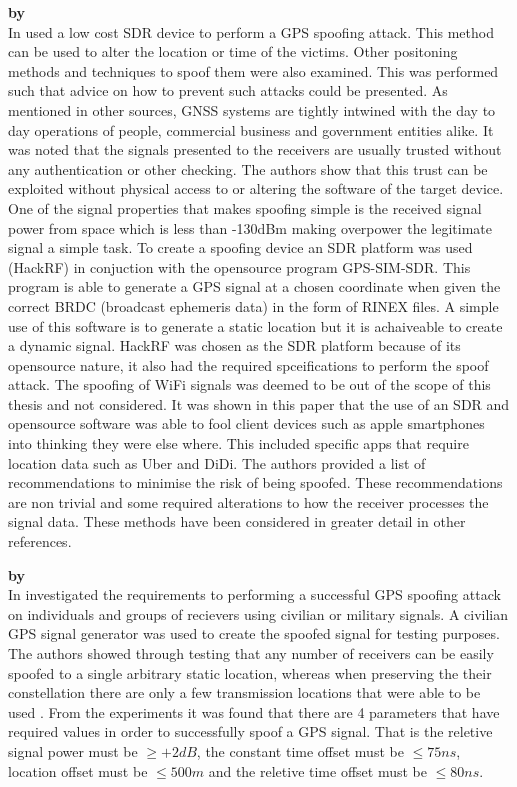 \textbf{\emph{} by \citeauthor{RN28}} \\
In \citeyear{RN28} \citeauthor{RN28} \cite{RN28} used a low cost SDR device to perform a GPS spoofing attack. This method can be used to alter the location or time
of the victims. Other positoning methods and techniques to spoof them were also examined. This was performed such that advice on how to prevent such attacks could be 
presented. As mentioned in other sources, GNSS systems are tightly intwined with the day to day operations of people, commercial business and government entities alike.
It was noted that the signals presented to the receivers are usually trusted without any authentication or other checking. The authors show that this trust can be exploited
without physical access to or altering the software of the target device. One of the signal properties that makes spoofing simple is the received signal power from space
which is less than -130dBm making overpower the legitimate signal a simple task. 
To create a spoofing device an SDR platform was used (HackRF) in conjuction with the opensource program GPS-SIM-SDR. This program is able to generate a GPS signal
at a chosen coordinate when given the correct BRDC (broadcast ephemeris data) in the form of RINEX files. A simple use of this software is to generate a static location
but it is achaiveable to create a dynamic signal. HackRF was chosen as the SDR platform because of its opensource nature, it also had the required spceifications to
perform the spoof attack. The spoofing of WiFi signals was deemed to be out of the scope of this thesis and not considered.
It was shown in this paper that the use of an SDR and opensource software was able to fool client devices such as apple smartphones into thinking they were else where.
This included specific apps that require location data such as Uber and DiDi. The authors provided a list of recommendations to minimise the risk of being spoofed. 
These recommendations are non trivial and some required alterations to how the receiver processes the signal data. These methods have been considered in greater
detail in other references.

\medskip

\textbf{\emph{} by \citeauthor{RN30}} \\
In \citeyear{RN30} \citeauthor{RN30} \cite{RN30} investigated the requirements to performing a successful GPS spoofing attack on individuals and groups of recievers
using civilian or military signals. A civilian GPS signal generator was used to create the spoofed signal for testing purposes.
The authors showed through testing that any number of receivers can be easily spoofed to a single arbitrary static location, whereas
when preserving the their constellation there are only a few transmission locations that were able to be used .
From the experiments it was found that there are 4 parameters that have required values in order to successfully spoof a GPS signal. That is the reletive signal 
power must be $\geq+2dB$, the constant time offset must be $\leq 75ns$, location offset must be $\leq 500m$ and the reletive time offset must be $\leq 80ns$.


